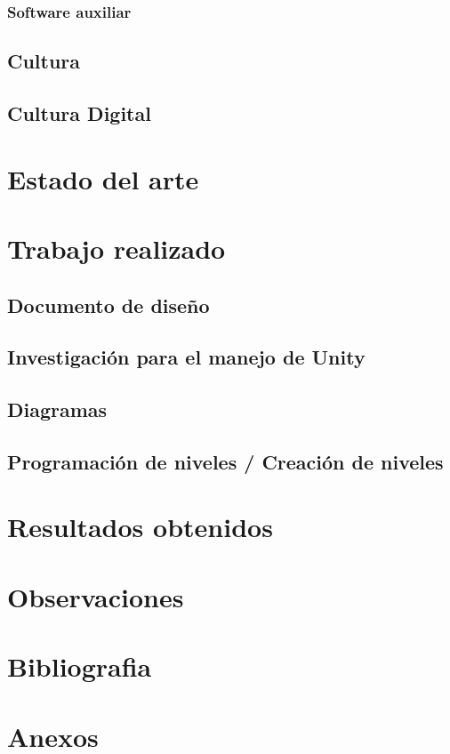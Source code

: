 \documentclass[11pt,letterpaper]{article}
\begin{document}
			\subsubsection{Software auxiliar}
		\subsection{Cultura}
		\subsection{Cultura Digital}
				
	\section{Estado del arte}
	\section{Trabajo realizado}
		\subsection{Documento de diseño}
		\subsection{Investigación para el manejo de Unity}
		\subsection{Diagramas}
		\subsection{Programación de niveles / Creación de niveles}
	\section{Resultados obtenidos}
	\section{Observaciones}
	\section{Bibliografia}	
	\section{Anexos}
\end{document}

